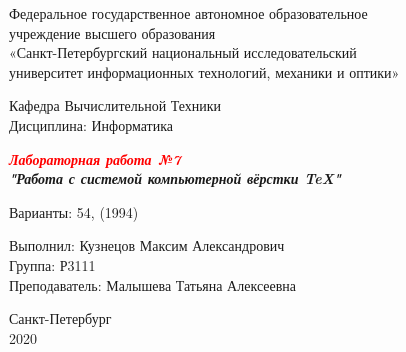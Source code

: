 \newpage
\thispagestyle{empty}
\begin{center}

\normalsize{Федеральное государственное автономное образовательное\\ 
учреждение высшего образования \\
«Санкт-Петербургский национальный исследовательский \\
университет информационных технологий, механики и оптики»}

\vspace{2 cm}

\Large{Кафедра Вычислительной Техники \\
Дисциплина: Информатика} 
\vspace{2cm}

\Huge{
\textbf{\textit{\textcolor{red}{Лабораторная работа №7} \\
"Работа с системой компьютерной вёрстки \TeX"}}}


\vspace{0.5cm}

\large{
Варианты: 54, (1994) \vspace{2cm}
}


\end{center}
\large{
\begin{flushright}
Выполнил: Кузнецов Максим Александрович \\
Группа: Р3111 \\
Преподаватель: Малышева Татьяна Алексеевна
\end{flushright}}
\null\vfill

\begin{center}
Санкт-Петербург \\
2020
\end{center}

